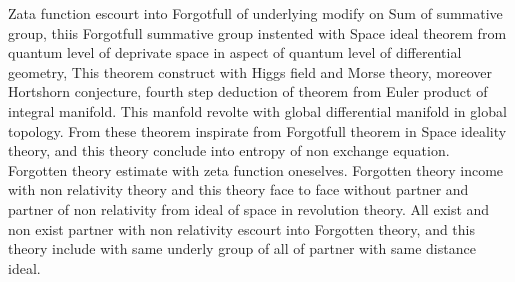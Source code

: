 \documentclass{jsarticle}
\begin{document}
{   Zata function escourt into Forgotfull of underlying modify on Sum
   of summative group, thiis Forgotfull summative group instented with
   Space ideal theorem from quantum level of deprivate space in aspect
   of quantum level of differential geometry,
   This theorem construct with Higgs field and Morse theory, moreover
   Hortshorn conjecture, fourth step deduction of theorem from 
   Euler product of integral manifold.
   This manfold revolte with global differential manifold in global topology.
   From these theorem inspirate from Forgotfull theorem in Space ideality
   theory, and this theory conclude into entropy of non exchange equation.
   Forgotten theory estimate with zeta function oneselves.
   Forgotten theory income with non relativity theory and this theory
   face to face without partner and partner of non relativity from
   ideal of space in revolution theory.
   All exist and non exist partner with non relativity escourt into 
   Forgotten theory, and this theory include with same underly group
   of all of partner with same distance ideal.

}
\end{document}
